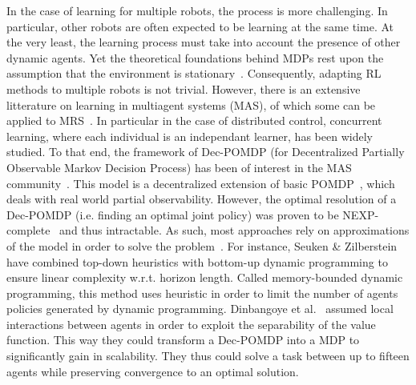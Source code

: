     In the case of learning for multiple robots, the process is more challenging. In particular, other robots are often expected to be learning at the same time. At the very least, the learning process must take into account the presence of other dynamic agents. Yet the theoretical foundations behind MDPs rest upon the assumption that the environment is stationary~\parencite{Littman1994, Parker2008}. Consequently, adapting RL methods to multiple robots is not trivial. However, there is an extensive litterature on learning in multiagent systems (MAS), of which some can be applied to MRS~\parencite{Stone2000, Yang2005, Panait2005}. In particular in the case of distributed control, concurrent learning, where each individual is an independant learner, has been widely studied. To that end, the framework of Dec-POMDP (for Decentralized Partially Observable Markov Decision Process) has been of interest in the MAS community~\parencite{Bernstein2002, Amato2013}. This model is a decentralized extension of basic POMDP~\parencite{Astrom1965}, which deals with real world partial observability. However, the optimal resolution of a Dec-POMDP (i.e. finding an optimal joint policy) was proven to be NEXP-complete~\parencite{Bernstein2002} and thus intractable. As such, most approaches rely on approximations of the model in order to solve the problem~\parencite{Beynier2011, Amato2013}. For instance, Seuken \& Zilberstein~\parencite{Seuken2007} have combined top-down heuristics with bottom-up dynamic programming to ensure linear complexity w.r.t. horizon length. Called memory-bounded dynamic programming, this method uses heuristic in order to limit the number of agents policies generated by dynamic programming. Dinbangoye et al.~\parencite{Dibangoye2015} assumed local interactions between agents in order to exploit the separability of the value function. This way they could transform a Dec-POMDP into a MDP to significantly gain in scalability. They thus could solve a task between up to fifteen agents while preserving convergence to an optimal solution.


